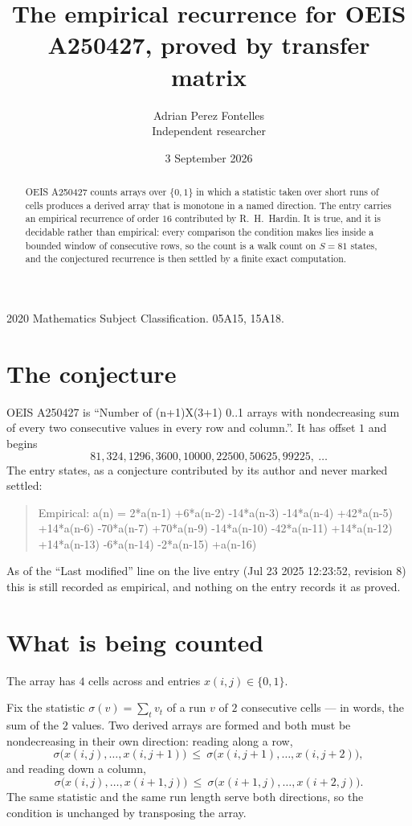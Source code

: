 \documentclass[11pt,a4paper]{article}
\title{The empirical recurrence for OEIS A250427, proved by transfer matrix}
\author{Adrian Perez Fontelles\\ \small Independent researcher}
\date{3 September 2026}
\theoremstyle{plain}
\theoremstyle{definition}
\begin{document}
\maketitle

\begin{abstract}
OEIS A250427 counts arrays over $\{0,1\}$ in which a statistic taken over short runs
of cells produces a derived array that is monotone in a named direction. The entry carries an
empirical recurrence of order $16$ contributed by R.~H.~Hardin. It is true, and it is
decidable rather than empirical: every comparison the condition makes lies inside a bounded
window of consecutive rows, so the count is a walk count on $S=81$ states, and the
conjectured recurrence is then settled by a finite exact computation.
\end{abstract}

\noindent\small 2020 Mathematics Subject Classification. 05A15, 15A18.\normalsize

\section{The conjecture}

OEIS A250427 is ``Number of (n+1)X(3+1) 0..1 arrays with nondecreasing sum of every two consecutive values in every row and column.''. It has offset $1$ and begins
\[
81, 324, 1296, 3600, 10000, 22500, 50625, 99225,\ \dots
\]
The entry states, as a conjecture contributed by its author and never marked settled:
\begin{quote}
Empirical: a(n) = 2*a(n-1) +6*a(n-2) -14*a(n-3) -14*a(n-4) +42*a(n-5) +14*a(n-6) -70*a(n-7) +70*a(n-9) -14*a(n-10) -42*a(n-11) +14*a(n-12) +14*a(n-13) -6*a(n-14) -2*a(n-15) +a(n-16)
\end{quote}
As of the ``Last modified'' line on the live entry (Jul 23 2025 12:23:52, revision 8) this is still
recorded as empirical, and nothing on the entry records it as proved.

\section{What is being counted}

The array has $4$ cells across and entries $x(i,j)\in\{0,1\}$.

Fix the statistic $\sigma(v)=\sum_{t} v_t$ of a run $v$ of $2$ consecutive cells --- in words,
the sum of the $2$ values. Two derived arrays are formed and both must be
nondecreasing in their own direction: reading along a row,
\[
\sigma\bigl(x(i,j),\dots,x(i,j{+}1)\bigr)\ \le\
\sigma\bigl(x(i,j{+}1),\dots,x(i,j{+}2)\bigr),
\]
and reading down a column,
\[
\sigma\bigl(x(i,j),\dots,x(i{+}1,j)\bigr)\ \le\
\sigma\bigl(x(i{+}1,j),\dots,x(i{+}2,j)\bigr).
\]
The same statistic and the same run length serve both directions, so the condition is
unchanged by transposing the array.
\end{document}
